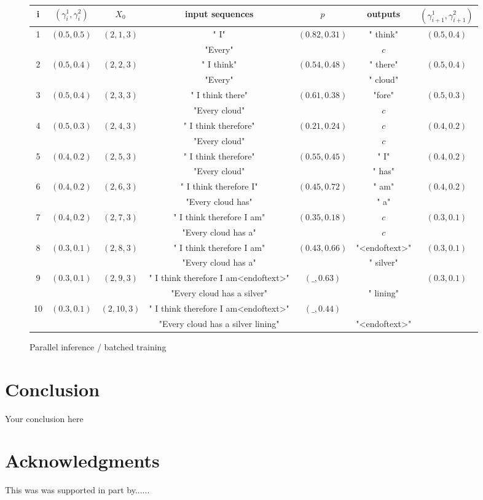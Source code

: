 \documentclass{article}
\begin{document}
\begin{figure}[!htb]
    \centering
    \begin{tabular}{|c|c|c|c|c|c|c|}
    i & $(\gamma_i^1,\gamma_i^2)$ & $X_0$ & input sequences & $p$ & outputs & $(\gamma_{i+1}^1,\gamma_{i+1}^2)$ \\
    \hline
    \hline
    1 & $(0.5,0.5)$ & $(2,1,3)$ & " I" & $(0.82,0.31)$ & " think" & $(0.5,0.4)$ \\
    &&& "Every"  && $c$ &\\
    \hline
    2 & $(0.5,0.4)$  & $(2,2,3)$ & " I think" & $(0.54,0.48)$ & " there" & $(0.5,0.4)$ \\
    &&& "Every" && " cloud" &\\
    \hline
    3 & $(0.5,0.4)$  & $(2,3,3)$ & " I think there" & $(0.61,0.38)$ & "fore" & $(0.5,0.3)$ \\
    &&& "Every cloud" && $c$ &\\
    \hline
    4 & $(0.5,0.3)$  & $(2,4,3)$ & " I think therefore" & $(0.21,0.24)$ & $c$ & $(0.4,0.2)$ \\
    &&& "Every cloud" && $c$ &\\
    \hline
    5 & $(0.4,0.2)$  & $(2,5,3)$ & " I think therefore" & $(0.55,0.45)$ & " I" & $(0.4,0.2)$ \\
    &&& "Every cloud" && " has" &\\
    \hline
    6 & $(0.4,0.2)$  & $(2,6,3)$ & " I think therefore I" & $(0.45,0.72)$ & " am" & $(0.4,0.2)$ \\
    &&& "Every cloud has" && " a" &\\
    \hline
    7 & $(0.4,0.2)$  & $(2,7,3)$ & " I think therefore I am" & $(0.35,0.18)$ & $c$ & $(0.3,0.1)$ \\
    &&& "Every cloud has a" && $c$ &\\
    \hline
    8 & $(0.3,0.1)$  & $(2,8,3)$ & " I think therefore I am" & $(0.43,0.66)$ & "<endoftext>" & $(0.3,0.1)$ \\
    &&& "Every cloud has a" && " silver" &\\
    \hline
    9 & $(0.3,0.1)$  & $(2,9,3)$ & " I think therefore I am<endoftext>" & $(\_,0.63)$ &  & $(0.3,0.1)$ \\
    &&& "Every cloud has a silver" && " lining" &\\
    \hline
    10 & $(0.3,0.1)$  & $(2,10,3)$ & " I think therefore I am<endoftext>" & $(\_,0.44)$ &  & \\
    &&& "Every cloud has a silver lining" && "<endoftext>" &\\
    \end{tabular}
    \caption{Parallel inference / batched training}
    \label{fig:enter-label}
\end{figure}


\newpage
\section{Conclusion}
Your conclusion here

\section*{Acknowledgments}
This was was supported in part by......

  
  
\end{document}
